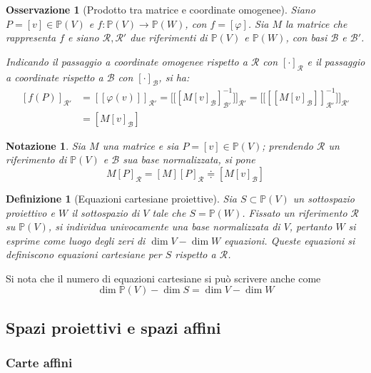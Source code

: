 \documentclass[11pt]{scrartcl}
\theoremstyle{style1}
\newtheorem{osservazione}{Osservazione}[section]
\newtheorem{definizione}{Definizione}[section]
\newtheorem{notazione}{Notazione}[section]
\numberwithin{equation}{subsection}
\begin{document}
\begin{osservazione}
	[Prodotto tra matrice e coordinate omogenee]
	Siano $P=[v] \in \mathbb{P}(V)$ e $f:\mathbb{P}(V) \to \mathbb{P}(W)$, con $f=[\varphi ]$.
	Sia $M$ la matrice che rappresenta $f$ e siano $\mathcal{R} ,\mathcal{R} '$ due riferimenti di $\mathbb{P}(V)$ e $\mathbb{P}(W)$, con basi $\mathcal{B} $ e $\mathcal{B}' $.

	Indicando il passaggio a coordinate omogenee rispetto a $\mathcal{R} $ con $[\cdot ]_\mathcal{R} $ e il passaggio a coordinate rispetto a $\mathcal{B} $ con $[\cdot ]_\mathcal{B} $, si ha:
\begin{equation}
	\begin{split}
		[f(P)]_{\mathcal{R} '} &= [[\varphi (v)]]_{\mathcal{R} '} = \Big[\big[[M[v]_{\mathcal{B} } ]_{\mathcal{B} '} ^{-1} \big]\Big]_{\mathcal{R} '} = \Big[\big[[[M[v]_\mathcal{B} ]]_{\mathcal{R} '} ^{-1} \big]\Big]_{\mathcal{R} '} \\
				       &= [M[v]_\mathcal{B} ]
	\end{split}
\end{equation}	
\end{osservazione}
\begin{notazione}
	Sia $M$ una matrice e sia $P =[v]\in \mathbb{P}(V)$; prendendo $\mathcal{R} $ un riferimento di $\mathbb{P}(V)$ e $\mathcal{B}$ sua base normalizzata, si pone
	\[
		M[P]_\mathcal{R}=[M][P]_\mathcal{R} \doteqdot \left[ M[v]_\mathcal{B}  \right] 
	\] 
\end{notazione}
\begin{definizione}
	[Equazioni cartesiane proiettive]
	Sia $S\subset \mathbb{P}(V)$ un sottospazio proiettivo e $W$ il sottospazio di $V$ tale che $S = \mathbb{P}(W)$.
	Fissato un riferimento $\mathcal{R} $ su $\mathbb{P}(V)$, si individua univocamente una base normalizzata di $V$, pertanto $W$ si esprime come luogo degli zeri di $\dim V - \dim W$ equazioni.
	Queste equazioni si definiscono \textit{equazioni cartesiane} per $S$ rispetto a $\mathcal{R} $.
\end{definizione}
\noindent Si nota che il numero di equazioni cartesiane si pu\`o scrivere anche come
\[
\dim \mathbb{P}(V) - \dim S = \dim V - \dim W
\] 

\subsection{Spazi proiettivi e spazi affini}
\subsubsection{Carte affini}
\end{document}
